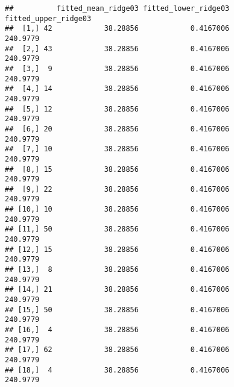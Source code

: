\documentclass[]{article}
\newenvironment{Shaded}{\begin{snugshade}}{\end{snugshade}}
\newcommand{\CommentTok}[1]{\textcolor[rgb]{0.56,0.35,0.01}{\textit{#1}}}
\begin{document}
\begin{verbatim}
##          fitted_mean_ridge03 fitted_lower_ridge03 fitted_upper_ridge03
##  [1,] 42            38.28856            0.4167006             240.9779
##  [2,] 43            38.28856            0.4167006             240.9779
##  [3,]  9            38.28856            0.4167006             240.9779
##  [4,] 14            38.28856            0.4167006             240.9779
##  [5,] 12            38.28856            0.4167006             240.9779
##  [6,] 20            38.28856            0.4167006             240.9779
##  [7,] 10            38.28856            0.4167006             240.9779
##  [8,] 15            38.28856            0.4167006             240.9779
##  [9,] 22            38.28856            0.4167006             240.9779
## [10,] 10            38.28856            0.4167006             240.9779
## [11,] 50            38.28856            0.4167006             240.9779
## [12,] 15            38.28856            0.4167006             240.9779
## [13,]  8            38.28856            0.4167006             240.9779
## [14,] 21            38.28856            0.4167006             240.9779
## [15,] 50            38.28856            0.4167006             240.9779
## [16,]  4            38.28856            0.4167006             240.9779
## [17,] 62            38.28856            0.4167006             240.9779
## [18,]  4            38.28856            0.4167006             240.9779
\end{verbatim}

\begin{Shaded}
\end{Shaded}
\end{document}
